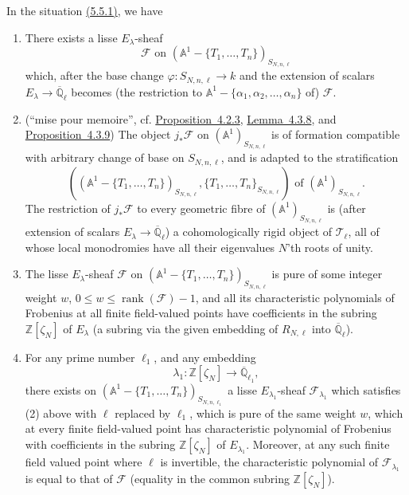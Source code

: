 In the situation \hyperref[par:5.5.1]{(5.5.1)}, we have
\begin{enumerate}[label=(\alph*)]
\item There exists a lisse \(E_\lambda\)-sheaf
\[
  \mathcal{F}\text{ on }
  (\mathbb{A}^1-\{T_1,\ldots,T_n\})_{S_{N,n,\ell}}
\]
which, after the base change \(\varphi:S_{N,n,\ell}\to k\) and the extension
of scalars \(E_\lambda\to\overline{\mathbb{Q}}_\ell\) becomes (the restriction
to \(\mathbb{A}^1-\{\alpha_1,\alpha_2,\ldots,\alpha_n\}\) of)
\(\mathcal{F}\).

\item (``mise pour memoire'', cf.
\hyperref[prop:4.2.3]{Proposition~4.2.3},
\hyperref[lem:4.3.8]{Lemma~4.3.8}, and
\hyperref[prop:4.3.9]{Proposition~4.3.9}) The object \(j_*\mathcal{F}\) on
\((\mathbb{A}^1)_{S_{N,n,\ell}}\) is of formation compatible with arbitrary
change of base on \(S_{N,n,\ell}\), and is adapted to the stratification
\[
  ((\mathbb{A}^1-\{T_1,\ldots,T_n\})_{S_{N,n,\ell}},
  \{T_1,\ldots,T_n\}_{S_{N,n,\ell}})
  \text{ of }(\mathbb{A}^1)_{S_{N,n,\ell}}.
\]
The restriction of \(j_*\mathcal{F}\) to every geometric fibre of
\((\mathbb{A}^1)_{S_{N,n,\ell}}\) is (after extension of scalars
\(E_\lambda\to\overline{\mathbb{Q}}_\ell\)) a cohomologically rigid object of
\(\mathcal{T}_\ell\), all of whose local monodromies have all their eigenvalues
\(N\)'th roots of unity.

\item The lisse \(E_\lambda\)-sheaf \(\mathcal{F}\) on
\((\mathbb{A}^1-\{T_1,\ldots,T_n\})_{S_{N,n,\ell}}\) is pure of some integer
weight \(w\), \(0\leq w\leq\operatorname{rank}(\mathcal{F})-1\), and all its
characteristic polynomials of Frobenius at all finite field-valued points have
coefficients in the subring \(\mathbb{Z}[\zeta_N]\) of \(E_\lambda\) (a subring
via the given embedding of \(R_{N,\ell}\) into
\(\overline{\mathbb{Q}}_\ell\)).

\item For any prime number \(\ell_1\), and any embedding
\[
  \lambda_1:\mathbb{Z}[\zeta_N]\to\overline{\mathbb{Q}}_{\ell_1},
\]
there exists on
\((\mathbb{A}^1-\{T_1,\ldots,T_n\})_{S_{N,n,\ell_1}}\) a lisse
\(E_{\lambda_1}\)-sheaf \(\mathcal{F}_{\lambda_1}\) which satisfies (2) above
with \(\ell\) replaced by \(\ell_1\), which is pure of the same weight \(w\),
which at every finite field-valued point has characteristic polynomial of
Frobenius with coefficients in the subring \(\mathbb{Z}[\zeta_N]\) of
\(E_{\lambda_1}\). Moreover, at any such finite field valued point where
\(\ell\) is invertible, the characteristic polynomial of
\(\mathcal{F}_{\lambda_1}\) is equal to that of \(\mathcal{F}\) (equality in
the common subring \(\mathbb{Z}[\zeta_N]\)).
\end{enumerate}

